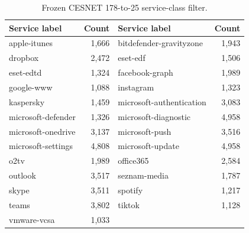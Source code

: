 \documentclass[pdflatex,referee,lineno,sn-basic,Numbered]{sn-jnl}
\begin{document}
\begin{appendices}
\begin{table}[ht]
\centering
\caption{Frozen CESNET 178-to-25 service-class filter.}
\label{tab:cesnet-policy}
\footnotesize
\begin{tabular}{lr@{\qquad}lr}
\hline
Service label & Count & Service label & Count \\
\hline
apple-itunes & 1,666 & bitdefender-gravityzone & 1,943 \\
dropbox & 2,472 & eset-edf & 1,506 \\
eset-edtd & 1,324 & facebook-graph & 1,989 \\
google-www & 1,088 & instagram & 1,323 \\
kaspersky & 1,459 & microsoft-authentication & 3,083 \\
microsoft-defender & 1,326 & microsoft-diagnostic & 4,958 \\
microsoft-onedrive & 3,137 & microsoft-push & 3,516 \\
microsoft-settings & 4,808 & microsoft-update & 4,958 \\
o2tv & 1,989 & office365 & 2,584 \\
outlook & 3,517 & seznam-media & 1,787 \\
skype & 3,511 & spotify & 1,217 \\
teams & 3,802 & tiktok & 1,128 \\
vmware-vcsa & 1,033 & & \\
\hline
\end{tabular}
\end{table}
\end{appendices}
\end{document}
